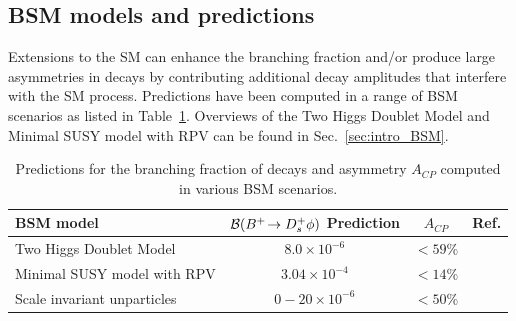 


\subsection{BSM models and predictions}
Extensions to the SM can enhance the branching fraction and/or produce large \CP asymmetries in \decay{\Bp}{\Dsp\phiz} decays by contributing additional decay amplitudes that interfere with the SM process.
Predictions have been computed in a range of BSM scenarios as listed in Table~\ref{tab:theory_BSM_br}. Overviews of the Two Higgs Doublet Model and Minimal SUSY model with RPV can be found in Sec.~\ref{sec:intro_BSM}.


\begin{table}[h]
    \centering
    \begin{tabular}{ l c c c }
        \hline
        BSM model                                        & ${\mathcal{B}}({{{B}^+}}\!\rightarrow {\ensuremath{{D}^+_{s}}}\phi)$ Prediction     & $A_{CP}$&  Ref.\\
        \hline
        Two Higgs Doublet Model                          & $8.0\times10^{-6}$    & $<59\%$ & ~\cite{Mohanta:2002wf}        \\
        Minimal SUSY model with RPV                      & $3.04\times10^{-4}$   & $<14\%$ & ~\cite{Mohanta:2002wf}     \\
        Scale invariant unparticles~\cite{GEORGI2007275} & $0-20\times10^{-6}$   & $<50\%$ & ~\cite{Mohanta:2007uu}     \\
        \hline 
    \end{tabular}
    \caption{Predictions for the branching fraction of \decay{\Bp}{\Dsp\phiz} decays and \CP asymmetry $A_{CP}$ computed in various BSM scenarios.}
    \label{tab:theory_BSM_br}
\end{table}


